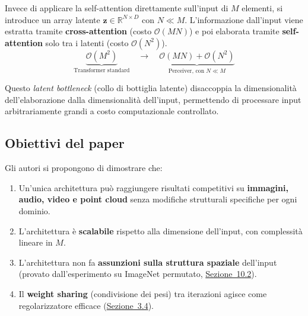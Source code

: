 \documentclass[12pt,a4paper]{article}
\begin{document}
\begin{formulabox}
Invece di applicare la self-attention direttamente sull'input di $M$ elementi, si introduce un array latente $\mathbf{z} \in \mathbb{R}^{N \times D}$ con $N \ll M$. L'informazione dall'input viene estratta tramite \textbf{cross-attention} (costo $\mathcal{O}(MN)$) e poi elaborata tramite \textbf{self-attention} solo tra i latenti (costo $\mathcal{O}(N^2)$).
\[
    \underbrace{\mathcal{O}(M^2)}_{\text{Transformer standard}} \quad \longrightarrow \quad \underbrace{\mathcal{O}(MN) + \mathcal{O}(N^2)}_{\text{Perceiver, con } N \ll M}
\]
\end{formulabox}

Questo \emph{latent bottleneck} (collo di bottiglia latente) disaccoppia la dimensionalit\`a dell'elaborazione dalla dimensionalit\`a dell'input, permettendo di processare input arbitrariamente grandi a costo computazionale controllato.

\subsection{Obiettivi del paper} \label{sec:obiettivi}

Gli autori si propongono di dimostrare che:
\begin{enumerate}[label=\arabic*.]
    \item Un'unica architettura pu\`o raggiungere risultati competitivi su \textbf{immagini, audio, video e point cloud} senza modifiche strutturali specifiche per ogni dominio.
    \item L'architettura \`e \textbf{scalabile} rispetto alla dimensione dell'input, con complessit\`a lineare in $M$.
    \item L'architettura non fa \textbf{assunzioni sulla struttura spaziale} dell'input (provato dall'esperimento su ImageNet permutato, \hyperref[sec:imagenet_perm]{Sezione~10.2}).
    \item Il \textbf{weight sharing} (condivisione dei pesi) tra iterazioni agisce come regolarizzatore efficace (\hyperref[sec:iterative]{Sezione~3.4}).
\end{enumerate}

\bigskip
\end{document}
